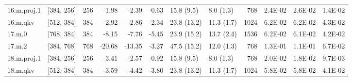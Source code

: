 \begin{table}
\begin{tabular}{llrrrrllrrrr}
16.m.proj.1 & [384, 256] & 256 & {\cellcolor[HTML]{EFF8AA}} \color[HTML]{000000} -1.98 & {\cellcolor[HTML]{F1F9AC}} \color[HTML]{000000} -2.39 & {\cellcolor[HTML]{EBF7A3}} \color[HTML]{000000} -0.63 & 15.8 (9.5) & 8.0 (1.3) & 768 & {\cellcolor[HTML]{D5ED88}} \color[HTML]{000000} 2.4E-02 & {\cellcolor[HTML]{D9EF8B}} \color[HTML]{000000} 2.6E-02 & {\cellcolor[HTML]{C3E67D}} \color[HTML]{000000} 1.4E-02 \\
16.m.qkv & [512, 384] & 384 & {\cellcolor[HTML]{F2FAAE}} \color[HTML]{000000} -2.92 & {\cellcolor[HTML]{F1F9AC}} \color[HTML]{000000} -2.86 & {\cellcolor[HTML]{EFF8AA}} \color[HTML]{000000} -2.34 & 23.8 (13.2) & 11.3 (1.7) & 1024 & {\cellcolor[HTML]{FFF8B4}} \color[HTML]{000000} 6.2E-02 & {\cellcolor[HTML]{FFF8B4}} \color[HTML]{000000} 6.2E-02 & {\cellcolor[HTML]{EEF8A8}} \color[HTML]{000000} 4.3E-02 \\
17.m.0 & [768, 384] & 384 & {\cellcolor[HTML]{FFFEBE}} \color[HTML]{000000} -8.15 & {\cellcolor[HTML]{FFFEBE}} \color[HTML]{000000} -7.76 & {\cellcolor[HTML]{F8FCB6}} \color[HTML]{000000} -5.45 & 23.9 (15.2) & 13.7 (2.4) & 1536 & {\cellcolor[HTML]{FFF8B4}} \color[HTML]{000000} 6.2E-02 & {\cellcolor[HTML]{FFFAB6}} \color[HTML]{000000} 6.1E-02 & {\cellcolor[HTML]{EEF8A8}} \color[HTML]{000000} 4.2E-02 \\
17.m.2 & [384, 768] & 768 & {\cellcolor[HTML]{FEE18D}} \color[HTML]{000000} -20.68 & {\cellcolor[HTML]{FFF2AA}} \color[HTML]{000000} -13.35 & {\cellcolor[HTML]{F2FAAE}} \color[HTML]{000000} -3.27 & 47.5 (15.2) & 12.0 (1.3) & 768 & {\cellcolor[HTML]{F88C51}} \color[HTML]{F1F1F1} 1.3E-01 & {\cellcolor[HTML]{FDAF62}} \color[HTML]{000000} 1.1E-01 & {\cellcolor[HTML]{FFF2AA}} \color[HTML]{000000} 6.7E-02 \\
18.m.proj.1 & [384, 256] & 256 & {\cellcolor[HTML]{F2FAAE}} \color[HTML]{000000} -3.41 & {\cellcolor[HTML]{F1F9AC}} \color[HTML]{000000} -2.57 & {\cellcolor[HTML]{ECF7A6}} \color[HTML]{000000} -0.92 & 15.8 (9.5) & 8.0 (1.3) & 768 & {\cellcolor[HTML]{CDEA83}} \color[HTML]{000000} 2.0E-02 & {\cellcolor[HTML]{C9E881}} \color[HTML]{000000} 1.8E-02 & {\cellcolor[HTML]{BBE278}} \color[HTML]{000000} 9.7E-03 \\
18.m.qkv & [512, 384] & 384 & {\cellcolor[HTML]{F4FAB0}} \color[HTML]{000000} -3.59 & {\cellcolor[HTML]{F5FBB2}} \color[HTML]{000000} -4.42 & {\cellcolor[HTML]{F4FAB0}} \color[HTML]{000000} -3.80 & 23.8 (13.2) & 11.3 (1.7) & 1024 & {\cellcolor[HTML]{FFFCBA}} \color[HTML]{000000} 5.8E-02 & {\cellcolor[HTML]{FFFCBA}} \color[HTML]{000000} 5.8E-02 & {\cellcolor[HTML]{ECF7A6}} \color[HTML]{000000} 4.1E-02 \\

\end{tabular}
\end{table}
